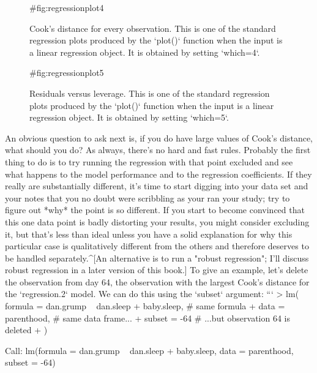 \begin{figure}[p]
\begin{center}
\caption{Cook's distance for every observation. This is one of the standard regression plots produced by the `plot()` function when the input is a linear regression object. It is obtained by setting `which=4`.}
\HR
{#fig:regressionplot4}
\end{center}
\end{figure}

\begin{figure}[p]
\begin{center}
\caption{Residuals versus leverage. This is one of the standard regression plots produced by the `plot()` function when the input is a linear regression object. It is obtained by setting `which=5`.}
\HR
{#fig:regressionplot5}
\end{center}
\end{figure}



An obvious question to ask next is, if you do have large values of Cook's distance, what should you do? As always, there's no hard and fast rules. Probably the first thing to do is to try running the regression with that point excluded and see what happens to the model performance and to the regression coefficients. If they really are substantially different, it's time to start digging into your data set and your notes that you no doubt were scribbling as your ran your study; try to figure out *why* the point is so different. If you start to become convinced that this one data point is badly distorting your results, you might consider excluding it, but that's less than ideal unless you have a solid explanation for why this particular case is qualitatively different from the others and therefore deserves to be handled separately.^[An alternative is to run a "robust regression"; I'll discuss robust regression in a later version of this book.] To give an example, let's delete the observation from day 64, the observation with the largest Cook's distance for the `regression.2` model. We can do this using the `subset` argument:
```
> lm( formula = dan.grump ~ dan.sleep + baby.sleep,  # same formula
+     data = parenthood,       # same data frame...
+     subset = -64             # ...but observation 64 is deleted
+ )

Call:
lm(formula = dan.grump ~ dan.sleep + baby.sleep, data = parenthood, 
    subset = -64)

